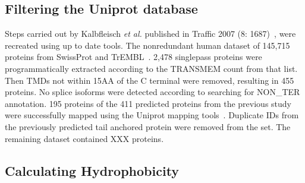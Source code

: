 
\subsection{Filtering the Uniprot database}
Steps carried out by Kalbfleisch \textit{et al.} published in Traffic 2007 (8: 1687)~\cite{Kalbfleisch2007}, were recreated using up to date tools. The non\-redundant human dataset of 145,715 proteins from SwissProt and TrEMBL~\cite{TheUniProtConsortium2014}. 2,478 singlepass proteins were programmatically extracted according to the TRANSMEM count from that list. Then TMDs not within 15AA of the C terminal were removed, resulting in 455 proteins. No splice isoforms were detected according to searching for NON\_TER annotation. 195 proteins of the 411 predicted proteins from the previous study were successfully mapped using the Uniprot mapping tools~\cite{TheUniProtConsortium2014}. Duplicate IDs from the previously predicted tail anchored protein were removed from the set. The remaining dataset contained XXX proteins.

\subsection{Calculating Hydrophobicity}

